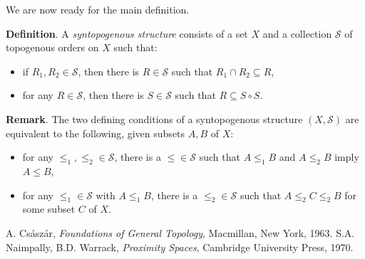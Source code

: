 \documentclass[12pt]{article}
\begin{document}
We are now ready for the main definition.

\textbf{Definition}.  A \emph{syntopogenous structure} consists of a set $X$ and a collection $\mathscr{S}$ of topogenous orders on $X$ such that:
\begin{itemize}
\item if $R_1,R_2\in \mathscr{S}$, then there is $R\in \mathscr{S}$ such that $R_1 \cap R_2 \subseteq R$,
\item for any $R \in \mathscr{S}$, then there is $S\in \mathscr{S}$ such that $R \subseteq S\circ S$.
\end{itemize}

\textbf{Remark}.  The two defining conditions of a syntopogenous structure $(X,\mathscr{S})$ are equivalent to the following, given subsets $A,B$ of $X$:
\begin{itemize}
\item for any $\le_1,\le_2\in \mathscr{S}$, there is a $\le\in \mathscr{S}$ such that $A\le_1 B$ and $A\le_2 B$ imply $A\le B$,
\item for any $\le_1\in \mathscr{S}$ with $A\le_1 B$, there is a $\le_2\in\mathscr{S}$ such that $A\le_2 C\le_2 B$ for some subset $C$ of $X$.
\end{itemize}

\begin{thebibliography}{9}
 A. Cs\'asz\'ar, \emph{Foundations of General Topology},
Macmillan, New York, 1963.
 S.A. Naimpally, B.D. Warrack, \emph{Proximity Spaces}, Cambridge University Press, 1970.
\end{thebibliography}
\end{document}
